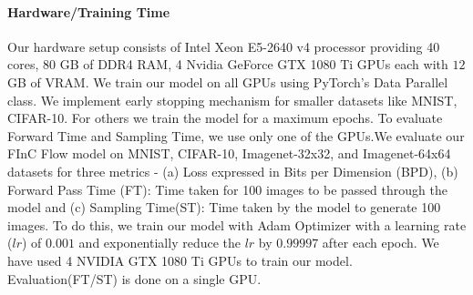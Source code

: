 \documentclass[a4paper,twoside]{article}
\theoremstyle{definition}
\begin{document}
\paragraph{Hardware/Training Time}
Our hardware setup consists of Intel Xeon E5-2640 v4 processor providing 40 cores, 80 GB of DDR4 RAM, 4 Nvidia GeForce GTX 1080 Ti GPUs each with $12$ GB of VRAM. We train our model on all GPUs using PyTorch's Data Parallel class. We implement early stopping mechanism for smaller datasets like MNIST, CIFAR-10. For others we train the model for a maximum epochs. To evaluate Forward Time and Sampling Time, we use only one of the GPUs.We evaluate our FInC Flow model on MNIST, CIFAR-10, Imagenet-32x32, and Imagenet-64x64 datasets for three metrics - (a) Loss expressed in Bits per Dimension (BPD), (b) Forward Pass Time (FT): Time taken for 100 images to be passed through the model and (c) Sampling Time(ST): Time taken by the model to generate 100 images.  To do this, we train our model with Adam Optimizer with a learning rate ($lr$) of $0.001$ and exponentially reduce the $lr$ by $0.99997$ after each epoch. We have used 4 NVIDIA GTX 1080 Ti GPUs to train our model. Evaluation(FT/ST) is done on a single GPU.
 
\end{document}
